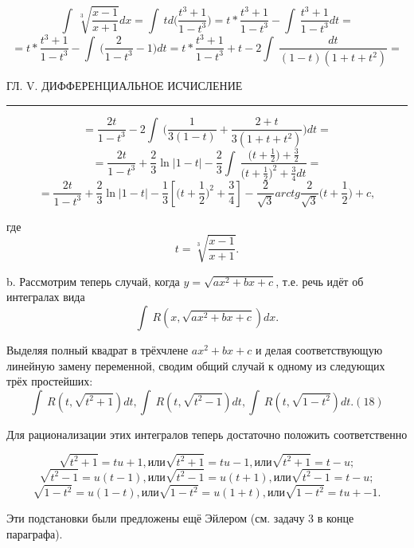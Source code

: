 \documentclass[10pt]{article}
\begin{document}
    $$\int \ \sqrt[3]{\frac{x-1}{x+1}} dx = \int \ t d\bigg( \frac{t^3 + 1}{1 - t^3} \bigg) = t * \frac{t^3 + 1}{1 - t^3} - \int \ \frac{t^3 + 1}{1 - t^3}dt = $$
    $$= t * \frac{t^3 + 1}{1 - t^3} - \int \ \bigg( \frac{2}{1 - t^3} - 1 \bigg)dt = t * \frac{t^3 + 1}{1 - t^3} + t - 2 \int \ \frac{dt}{(1-t)(1 + t + t^2)} =$$
  
  \newpage

    \begin{center}
        \begin{spacing}
            ГЛ. V. ДИФФЕРЕНЦИАЛЬНОЕ ИСЧИСЛЕНИЕ
            \noindent\rule{\textwidth}{1pt}
		\end{spacing}
    \end{center}


    $$= \frac{2t}{1-t^3} - 2\int \ \bigg( \frac{1}{3(1-t)} + \frac{2 + t}{3(1 + t + t^2)}\bigg)dt = $$
    $$= \frac{2t}{1-t^3} + \frac{2}{3}\ln{|1-t|} - \frac{2}{3}\int \ \frac{\bigg(t + \frac{1}{2}\bigg) + \frac{3}{2}}{\bigg(t + \frac{1}{2}\bigg)^2 + \frac{3}{4} dt} = $$
    $$= \frac{2t}{1-t^3} + \frac{2}{3}\ln{|1 - t|} - \frac{1}{3}\left[{\bigg(t + \frac{1}{2}\bigg)^2 + \frac{3}{4}}\right] - \frac{2}{\sqrt{3}}arctg\frac{2}{\sqrt{3}}\bigg(t + \frac{1}{2}\bigg) + c,$$
    \par где $$ t = \sqrt[3]{\frac{x - 1}{x + 1}}.$$

    \par b. Рассмотрим теперь случай, когда $y = \sqrt{ax^2 + bx +c}$, т.е. речь идёт об интегралах вида
    $$\int \ R(x, \sqrt{ax^2 + bx +c})dx.$$

    \par Выделяя полный квадрат в трёхчлене $ax^2 + bx + c$ и делая соответствующую линейную замену переменной, сводим общий случай к одному из следующих трёх простейших:
    $$ \int \ R(t, \sqrt{t^2 + 1})dt, \int \ R(t, \sqrt{t^2 - 1})dt, \int \ R(t, \sqrt{1 - t^2})dt.   (18)$$  

    \par Для рационализации этих интегралов теперь достаточно положить соответственно

    $$\sqrt{t^2 + 1} = tu + 1, или \sqrt{t^2 + 1} = tu - 1, или \sqrt{t^2 + 1} = t - u;$$
    $$\sqrt{t^2 - 1} = u(t - 1), или \sqrt{t^2 - 1} = u(t + 1), или \sqrt{t^2 - 1} = t - u; $$
    $$\sqrt{1 - t^2} = u(1 - t) , или \sqrt{1 - t^2} = u(1 + t), или \sqrt{1 - t^2} = tu +- 1. $$
    \par Эти подстановки были предложены ещё Эйлером (см. задачу 3 в конце параграфа).
\end{document}
